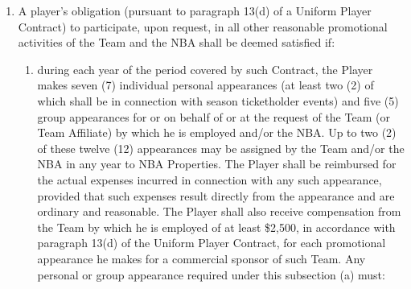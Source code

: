 \documentclass[
]{book}
\providecommand{\tightlist}{%
  \setlength{\itemsep}{0pt}\setlength{\parskip}{0pt}}
\begin{document}
\begin{enumerate}
\def\labelenumi{(\alph{enumi})}
\tightlist
\item
  A player's obligation (pursuant to paragraph 13(d) of a Uniform Player Contract) to participate, upon request, in all other reasonable promotional activities of the Team and the NBA shall be deemed satisfied if:

  \begin{enumerate}
  \def\labelenumii{(\roman{enumii})}
  \tightlist
  \item
    during each year of the period covered by such Contract, the Player makes seven (7) individual personal appearances (at least two (2) of which shall be in connection with season ticketholder events) and five (5) group appearances for or on behalf of or at the request of the Team (or Team Affiliate) by which he is employed and/or the NBA. Up to two (2) of these twelve (12) appearances may be assigned by the Team and/or the NBA in any year to NBA Properties. The Player shall be reimbursed for the actual expenses incurred in connection with any such appearance, provided that such expenses result directly from the appearance and are ordinary and reasonable. The Player shall also receive compensation from the Team by which he is employed of at least \$2,500, in accordance with paragraph 13(d) of the Uniform Player Contract, for each promotional appearance he makes for a commercial sponsor of such Team. Any personal or group appearance required under this subsection (a) must:


\end{enumerate}
\end{enumerate}
\end{document}

